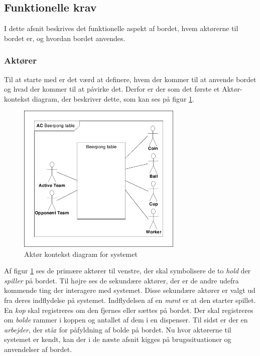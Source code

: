 \documentclass[Rapport/Rapport_main.tex]{subfiles}
\begin{document}
\subsection{Funktionelle krav}
I dette afsnit beskrives det funktionelle aspekt af bordet, hvem aktørerne til bordet er, og hvordan bordet anvendes.
\subsubsection{Aktører}
Til at starte med er det værd at definere, hvem der kommer til at anvende bordet og hvad der kommer til at påvirke det. Derfor er der som det første et Aktør-kontekst diagram, der beskriver dette, som kan ses på figur \ref{fig:rap_actor_context}.
\begin{figure}[H]
    \centering
    \includegraphics[width=0.7\textwidth,trim={0.24in 0.24in 0.24in 0.24in},clip, page=1]{Kravspecifikation/Funktionelle_krav/graphics_funktionel/Krav-spec-diagrammer.pdf}
    \caption{Aktør kontekst diagram for systemet}
    \label{fig:rap_actor_context}
\end{figure}
Af figur \ref{fig:rap_actor_context} ses de primære aktører til venstre, der skal symbolisere de to \textit{hold} der \textit{spiller} på bordet. Til højre ses de sekundære aktører, der er de andre udefra kommende ting der interagere med systemet. Disse sekundære aktører er valgt ud fra deres indflydelse på systemet. Indflydelsen af en \textit{mønt} er at den starter spillet. En \textit{kop} skal registreres om den fjernes eller sættes på bordet. Der skal registreres om \textit{bolde} rammer i koppen og antallet af dem i en dispenser. Til sidst er der en \textit{arbejder}, der står for påfyldning af bolde på bordet. Nu hvor aktørerne til systemet er kendt, kan der i de næste afsnit kigges på brugssituationer og anvendelser af bordet.
\end{document}
